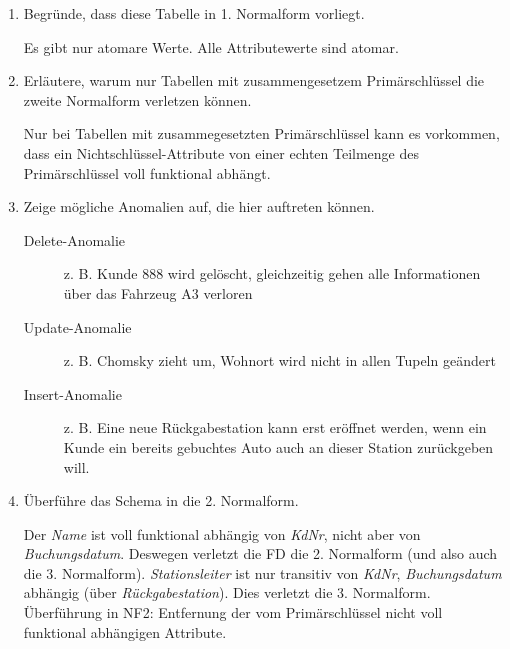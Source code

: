\documentclass{lehramt-informatik-aufgabe}
\begin{document}
\begin{enumerate}


\item Begründe, dass diese Tabelle in 1. Normalform vorliegt.

\begin{liAntwort}
Es gibt nur atomare Werte. Alle Attributewerte sind atomar.
\end{liAntwort}


\item Erläutere, warum nur Tabellen mit zusammengesetzem Primärschlüssel
die zweite Normalform verletzen können.

\begin{liAntwort}
Nur bei Tabellen mit zusammegesetzten Primärschlüssel kann es vorkommen,
dass ein Nichtschlüssel-Attribute von einer echten Teilmenge des
Primärschlüssel voll funktional abhängt.
\end{liAntwort}


\item Zeige mögliche Anomalien auf, die hier auftreten können.

\begin{liAntwort}
\begin{description}
\item[Delete-Anomalie]

z. B. Kunde 888 wird gelöscht, gleichzeitig gehen alle Informationen
über das Fahrzeug A3 verloren

\item[Update-Anomalie]

z. B. Chomsky zieht um, Wohnort wird nicht in allen Tupeln geändert

\item[Insert-Anomalie]

z. B. Eine neue Rückgabestation kann erst eröffnet werden, wenn ein
Kunde ein bereits gebuchtes Auto auch an dieser Station zurückgeben
will.
\end{description}
\end{liAntwort}


\item Überführe das Schema in die 2. Normalform.

\begin{liAntwort}
Der \emph{Name} ist voll funktional abhängig von \emph{KdNr}, nicht aber
von \emph{Buchungsdatum}. Deswegen verletzt die FD  die
2. Normalform (und also auch die 3. Normalform). \emph{Stationsleiter} ist nur
transitiv von \emph{KdNr}, \emph{Buchungsdatum} abhängig (über
\emph{Rückgabestation}). Dies verletzt die 3. Normalform. Überführung in
NF2: Entfernung der vom Primärschlüssel nicht voll funktional abhängigen
Attribute.


\end{liAntwort}
\end{enumerate}
\end{document}

